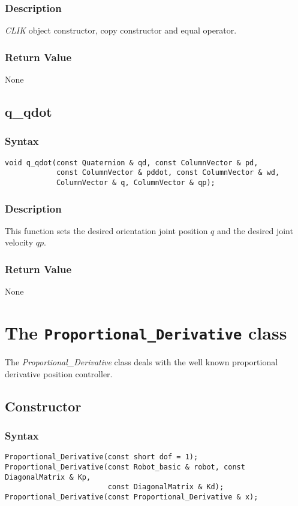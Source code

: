 \documentclass[dvips,11pt,fleqn]{report}
\begin{document}
\subsubsection*{Description}   
\emph{CLIK} object constructor, copy constructor and equal operator.

\subsubsection*{Return Value}

None

\newpage

\subsection*{q\_qdot}
\subsubsection*{Syntax}
\begin{verbatim}
void q_qdot(const Quaternion & qd, const ColumnVector & pd, 
            const ColumnVector & pddot, const ColumnVector & wd,
            ColumnVector & q, ColumnVector & qp);
\end{verbatim}

\subsubsection*{Description}   
This function sets the desired orientation joint position $q$ and the
desired joint velocity $qp$.
\subsubsection*{Return Value}

None

\newpage

\section{The \texttt{Proportional\_Derivative} class}

The \emph{Proportional\_Derivative} class deals with the well known
proportional derivative position controller.

\subsection*{Constructor}
\subsubsection*{Syntax}
\begin{verbatim}
Proportional_Derivative(const short dof = 1);
Proportional_Derivative(const Robot_basic & robot, const DiagonalMatrix & Kp, 
                        const DiagonalMatrix & Kd);
Proportional_Derivative(const Proportional_Derivative & x);
\end{verbatim}
\end{document}
